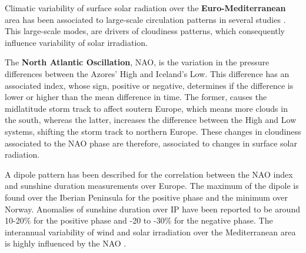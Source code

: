 
Climatic variability of surface solar radiation over the \textbf{Euro-Mediterranean} area has been associated to large-scale circulation patterns in several studies \cite*{Jerez2013a, Chiacchio2010, Sanchez-Lorenzo2009, Pozo-Vazquez2004}. This large-scale modes, are drivers of cloudiness patterns, which consequently influence variability of solar irradiation.

The \textbf{North Atlantic Oscillation}, NAO, is the variation in the pressure differences between the Azores' High and Iceland's Low. This difference has an associated index, whose sign, positive or negative, determines if the difference is lower or higher than the mean difference in time. The former, causes the midlatitude storm track to affect soutern Europe, which means more clouds in the south, whereas the latter, increases the difference between the High and Low systems, shifting the storm track to northern Europe. These changes in cloudiness associated to the NAO phase are therefore, associated to changes in surface solar radiation.


A dipole pattern has been described for the correlation between the NAO index and sunshine duration measurements \cite*{Pozo-Vazquez2004} over Europe. The maximum of the dipole is found over the Iberian Peninsula for the positive phase and the minimum over Norway. Anomalies of sunshine duration over IP have been reported to be around 10-20$\%$ for the positive phase and -20 to -30$\%$ for the negative phase. The interannual variability of wind and solar irradiation over the Mediterranean area is highly influenced by the NAO \cite*{pozo-Vazquez2011}.

